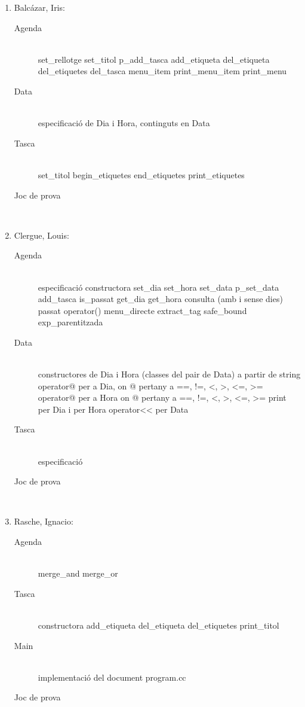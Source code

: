 \documentclass[a4paper,10pt]{article}
\begin{document}
\begin{enumerate}
  \item \textsf{Balc\'{a}zar, Iris}:
  \begin{description}
    \item[Agenda] \hfill \\
    set_rellotge
    set_titol
    p_add_tasca    
    add_etiqueta
    del_etiqueta
    del_etiquetes
    del_tasca
    menu_item
    print_menu_item
    print_menu
    \item[Data] \hfill \\
    especificaci\'o de Dia i Hora, continguts en Data
    \item[Tasca] \hfill \\
    set_titol
    begin_etiquetes
    end_etiquetes
    print_etiquetes
    \item[Joc de prova] \hfill \\
    
  \end{description}
  \item \textsf{Clergue, Louis}:
  \begin{description}
    \item[Agenda] \hfill \\
    especificaci\'o
    constructora
    set_dia
    set_hora
    set_data
    p_set_data
    add_tasca
    is_passat
    get_dia
    get_hora
    consulta (amb i sense dies)
    passat
    operator()
    menu_directe
    extract_tag
    safe_bound
    exp_parentitzada
    \item[Data] \hfill \\
    constructores de Dia i Hora (classes del pair de Data) a partir de string
    operator@ per a Dia, on @ pertany a { ==, !=, <, >, <=, >=}
    operator@ per a Hora on @ pertany a { ==, !=, <, >, <=, >=}
    print per Dia i per Hora
    operator<< per Data
    \item[Tasca] \hfill \\
    especificaci\'o
    \item[Joc de prova] \hfill \\
    
  \end{description}
  \item \textsf{Rasche, Ignacio}:
  \begin{description}
    \item[Agenda] \hfill \\
    merge_and
    merge_or
    \item[Tasca] \hfill \\
    constructora
    add_etiqueta
    del_etiqueta
    del_etiquetes
    print_titol
    \item[Main] \hfill \\
    implementaci\'o del document program.cc
    \item[Joc de prova] \hfill \\
    
  \end{description}
\end{enumerate}
\end{document}
